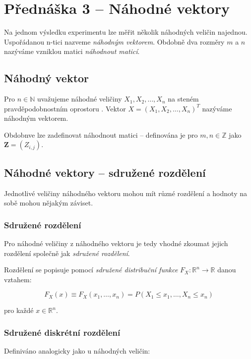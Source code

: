\section{Přednáška 3 -- Náhodné vektory}

Na jednom výsledku experimentu lze měřit několik náhodných veličin najednou.
Uspořádanou n-tici nazveme \textit{náhodným vektorem}.
Obdobně dva rozměry $m$ a $n$ nazýváme vzniklou matici \textit{náhodnout maticí}.

\subsection{Náhodný vektor}

Pro $n \in \mathbb{N}$ uvažujeme náhodné veličiny $X_1, X_2, \dots, X_n$ na steném pravděpodobnostním oprostoru \pspace.
Vektor $X = (X_1, X_2, \dots, X_n)^T$ nazýváme náhodným vektorem.

Obdobnve lze zadefinovat náhodnout matici -- definována je pro $m,n \in \mathbb{Z}$ jako $\mathbf{Z} = (Z_{i,j})$.

\subsection{Náhodné vektory -- sdružené rozdělení}

Jednotlivé veličiny náhodného vektoru mohou mít různé rozdělení a hodnoty na sobě mohou nějakým záviset.

\subsubsection*{Sdružené rozdělení}

Pro náhodné veličiny z náhodného vektoru je tedy vhodné zkoumat jejich rozdělení společně jak \textit{sdružené rozdělení}.

Rozdělení se popisuje pomocí \textit{sdružené distribuční funkce} $F_X: \mathbb{R}^n \rightarrow \mathbb{R}$ danou vztahem:

$$
    F_X(x) \equiv F_X(x_1, \dots, x_n) = P(X_1 \leq x_1, \dots, X_n \leq x_n)
$$

pro každé $x \in \mathbb{R}^n$.

\subsubsection*{Sdružené diskrétní rozdělení}

Definiváno analogicky jako u náhodných veličin:


